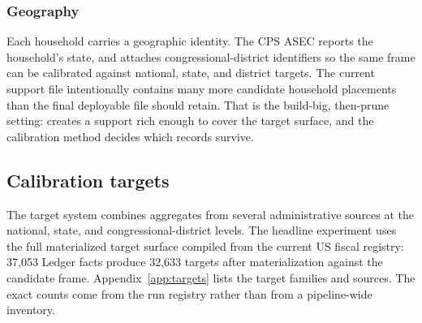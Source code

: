 \subsubsection{Geography}

Each household carries a geographic identity. The CPS ASEC reports the household's state, and
\microcosm{} attaches congressional-district identifiers so the same frame can be calibrated against
national, state, and district targets. The current support file intentionally contains many more
candidate household placements than the final deployable file should retain. That is the build-big,
then-prune setting: \microcosm{} creates a support rich enough to cover the target surface, and the
calibration method decides which records survive.

\subsection{Calibration targets}

The target system combines aggregates from several administrative sources at the national, state, and
congressional-district levels. The headline experiment uses the full materialized target surface compiled
from the current \microcosm{} US fiscal registry: 37{,}053 Ledger facts produce 32{,}633 targets after
materialization against the candidate frame. Appendix~\ref{app:targets} lists the target families and
sources. The exact counts come from the run registry rather than from a pipeline-wide inventory.



